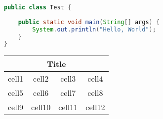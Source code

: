 \documentclass[letterpaper,12pt]{article}
\begin{document}
\begin{minimal}
\begin{lstlisting}[language=java]
public class Test {
	
	public static void main(String[] args) {
		System.out.println("Hello, World");
	}
}
\end{lstlisting}
\end{minimal}

\begin{center}
\begin{tabular}{ |c|c|c|c| }
\hline
\multicolumn{4}{|c|}{Title} \\
\hline
	cell1 & cell2 & cell3 & cell4 \\
	\hline
	\hline
	cell5 & cell6 & cell7 & cell8 \\
	cell9 & cell10 & cell11 & cell12 \\
\hline
\end{tabular}
\end{center}
\end{document}
